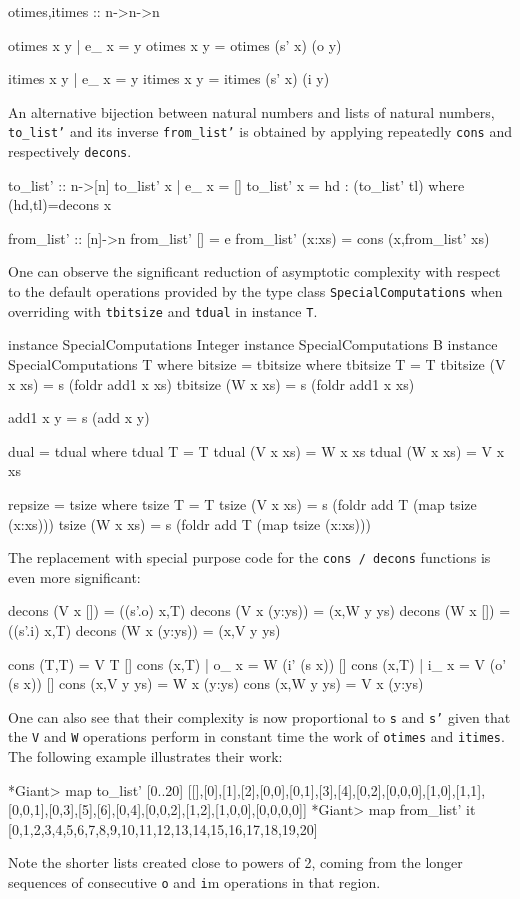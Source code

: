 \documentclass{TOOLS/llncs}
\begin{document}
\begin{code}
  otimes,itimes :: n->n->n
  
  otimes x y | e_ x = y
  otimes x y = otimes (s' x) (o y)
   
  itimes x y | e_ x = y
  itimes x y = itimes (s' x) (i y)
\end{code}

An alternative bijection between natural numbers and 
lists of natural numbers, {\tt to\_list'}
and its inverse {\tt from\_list'} is obtained by 
applying repeatedly {\tt cons}
and respectively {\tt decons}.

\begin{code}
  to_list' :: n->[n]
  to_list' x | e_ x = []
  to_list' x = hd : (to_list' tl) where (hd,tl)=decons x

  from_list' :: [n]->n
  from_list' [] = e
  from_list' (x:xs) = cons (x,from_list' xs)
\end{code}

One can observe the significant reduction of asymptotic complexity
with respect to the default operations provided by the type
class {\tt SpecialComputations}
when overriding with {\tt tbitsize} and {\tt tdual} in instance {\tt T}.
\begin{code}  
instance SpecialComputations Integer
instance SpecialComputations B
instance SpecialComputations T where
  bitsize = tbitsize where
    tbitsize T = T
    tbitsize (V x xs) = s (foldr add1 x xs)
    tbitsize (W x xs) = s (foldr add1 x xs)
    
    add1 x y = s (add x y)
    
  dual = tdual where
    tdual T = T
    tdual (V x xs) = W x xs
    tdual (W x xs) = V x xs 
    
  repsize = tsize where
    tsize T = T
    tsize (V x xs) = s (foldr add T (map tsize (x:xs)))
    tsize (W x xs) = s (foldr add T (map tsize (x:xs)))
\end{code}
The replacement with special purpose code for the {\tt cons / decons} functions
is even more significant:
\begin{code}
  decons (V x []) = ((s'.o) x,T)
  decons (V x (y:ys)) = (x,W y ys)
  decons (W x []) = ((s'.i) x,T)
  decons (W x (y:ys)) = (x,V y ys)

  cons (T,T) = V T []
  cons (x,T) | o_ x =  W (i' (s x)) []
  cons (x,T) | i_ x = V (o' (s x)) []
  cons (x,V y ys) = W x (y:ys)
  cons (x,W y ys) = V x (y:ys)
\end{code}
One can also see that their complexity is now proportional to {\tt s} and {\tt s'}
given that the {\tt V} and {\tt W} operations perform in constant time the 
work of {\tt otimes} and {\tt itimes}.
The following example illustrates their work:
\begin{codex}
*Giant> map to_list' [0..20]
[[],[0],[1],[2],[0,0],[0,1],[3],[4],[0,2],[0,0,0],[1,0],[1,1],
    [0,0,1],[0,3],[5],[6],[0,4],[0,0,2],[1,2],[1,0,0],[0,0,0,0]]
*Giant> map from_list' it
[0,1,2,3,4,5,6,7,8,9,10,11,12,13,14,15,16,17,18,19,20]\end{codex}
Note the shorter lists created close to powers of 2, coming from
the longer sequences of consecutive 
{\tt o} and {\tt i}m operations in that region.
\end{document}

